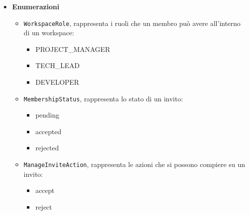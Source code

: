 \documentclass[a4paper, 11pt]{article}
\newcounter{subsubsubsection}[subsubsection]
\newcounter{subsubsubsubsection}[subsubsubsection]
\begin{document}
\begin{itemize}
	\item \textbf{Enumerazioni}
		\begin{itemize}
	  		\item \texttt{WorkspaceRole}, rappresenta i ruoli che un membro può avere all'interno di un workspace:
				\begin{itemize}
		  			\item PROJECT\_MANAGER
		  			\item TECH\_LEAD
		  			\item DEVELOPER
				\end{itemize}
			\item \texttt{MembershipStatus}, rappresenta lo stato di un invito:
				\begin{itemize}
		  			\item pending
		  			\item accepted
		  			\item rejected
				\end{itemize}
			\item \texttt{ManageInviteAction}, rappresenta le azioni che si possono compiere su un invito:
				\begin{itemize}
		  			\item accept
		  			\item reject
				\end{itemize}
		\end{itemize}
\end{itemize}
\end{document}
